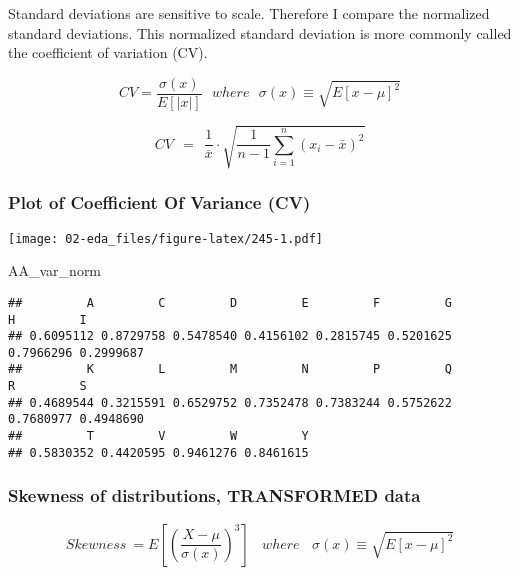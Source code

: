 \documentclass[]{article}
\newenvironment{Shaded}{\begin{snugshade}}{\end{snugshade}}
\newcommand{\NormalTok}[1]{#1}
\begin{document}
Standard deviations are sensitive to scale. Therefore I compare the
normalized standard deviations. This normalized standard deviation is
more commonly called the coefficient of variation (CV).

\begin{equation} 
CV = \frac {\sigma (x)} {E [|x|]} ~~~ where ~~~ \sigma(x) \equiv \sqrt{ E[x - \mu]^2 }
\end{equation}

\begin{equation} 
CV ~~=~~ \frac{1}{\bar x} \cdot \sqrt{ \frac{1}{n-1} \sum^n_{i=1} (x_i - \bar x)^2}
\end{equation}

\hypertarget{plot-of-coefficient-of-variance-cv}{%
\subsubsection{Plot of Coefficient Of Variance
(CV)}\label{plot-of-coefficient-of-variance-cv}}

\texttt{[image: 02-eda\_files/figure-latex/245-1.pdf]}

\begin{Shaded}
\begin{Highlighting}[]
\NormalTok{AA_var_norm}
\end{Highlighting}
\end{Shaded}

\begin{verbatim}
##         A         C         D         E         F         G         H         I 
## 0.6095112 0.8729758 0.5478540 0.4156102 0.2815745 0.5201625 0.7966296 0.2999687 
##         K         L         M         N         P         Q         R         S 
## 0.4689544 0.3215591 0.6529752 0.7352478 0.7383244 0.5752622 0.7680977 0.4948690 
##         T         V         W         Y 
## 0.5830352 0.4420595 0.9461276 0.8461615
\end{verbatim}

\newpage

\hypertarget{skewness-of-distributions-transformed-data}{%
\subsubsection{Skewness of distributions, TRANSFORMED
data}\label{skewness-of-distributions-transformed-data}}

\begin{equation} 
Skewness ~= E\left[ \left( \frac{X - \mu}{\sigma(x)} \right)^3 \right] ~~~~ where ~~~~ \sigma(x) \equiv \sqrt{ E[x - \mu]^2 }
\end{equation}
\end{document}
